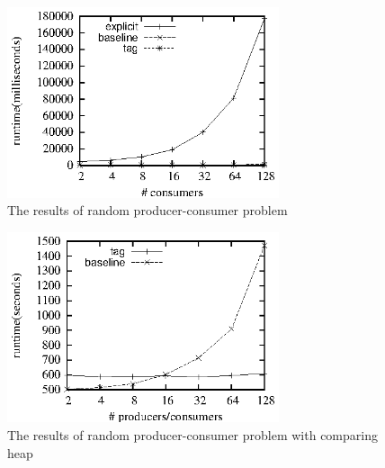 \documentclass[preprint]{sigplanconf}
\begin{document}
\begin{figure}[ht!]
  \centering
  \includegraphics[width=80mm]{fig/rpc.eps}
  \caption{The results of random producer-consumer problem}
  \label{fig:rpc_eval}
\end{figure}

\begin{figure}[ht!]
  \centering
  \includegraphics[width=80mm]{fig/rpch.eps}
  \caption{The results of random producer-consumer problem with comparing heap}
  \label{fig:rpc_eval}
\end{figure}
\end{document}

